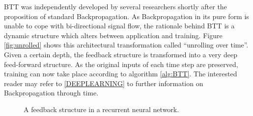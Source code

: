 \documentclass[10pt,a4paper,DIV=11]{scrreprt}
\begin{document}
BTT was independently developed by several researchers shortly after the proposition of standard Backpropagation.\cite{BTT1}\cite{BTT2}\cite{BTT3}
As Backpropagation in its pure form is unable to cope with bi-directional signal flow, the rationale behind BTT is a dynamic structure which alters
between application and training. Figure \ref{fig:unrolled} shows this architectural transformation called “unrolling over time”. Given a certain 
depth, the feedback structure is transformed into a very deep feed-forward structure. As the original inputs of each time step are preserved,
training can now take place according to algorithm \ref{alg:BTT}. The interested reader may refer to \ref{DEEPLEARNING} to further information on
Backpropagation through time.

\begin{figure}[H]

\centering
\caption{A feedback structure in a recurrent neural network.}
\label{fig:feedback}
\end{figure}
\end{document}

